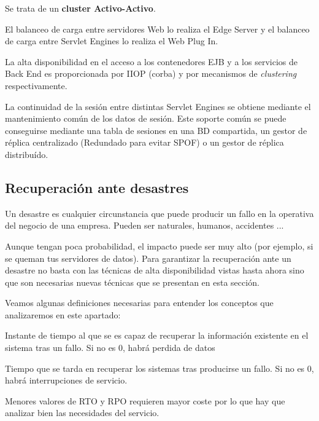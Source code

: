 \begin{enumerate}
\begin{example}
Se trata de un \textbf{cluster Activo-Activo}.

El balanceo de carga entre servidores Web lo realiza el Edge Server y el balanceo de carga entre Servlet Engines lo realiza el Web Plug In.

La alta disponibilidad en el acceso a los contenedores EJB y a los servicios de Back End es proporcionada por IIOP (corba) y por mecanismos de \textit{clustering} respectivamente.

La continuidad de la sesión entre distintas Servlet Engines se obtiene mediante el mantenimiento común de los datos de sesión. Este soporte común se puede conseguirse mediante una tabla de sesiones en una BD compartida, un gestor de réplica centralizado (Redundado para evitar SPOF) o un gestor de réplica distribuído.
\end{example}

\end{enumerate}

\subsection{Recuperación ante desastres}

Un desastre es cualquier circunstancia que puede producir un fallo en la operativa del negocio de una empresa. Pueden ser naturales, humanos, accidentes ...

Aunque tengan poca probabilidad, el impacto puede ser muy alto (por ejemplo, si se queman tus servidores de datos). Para garantizar la recuperación ante un desastre no basta con las técnicas de alta disponibilidad vistas hasta ahora sino que son necesarias nuevas técnicas que se presentan en esta sección.

Veamos algunas definiciones necesarias para entender los conceptos que analizaremos en este apartado:

\begin{defn}
Instante de tiempo al que se es capaz de recuperar la información existente en el sistema tras un fallo. Si no es 0, habrá perdida de datos
\end{defn}

\begin{defn}
Tiempo que se tarda en recuperar los sistemas tras producirse un fallo. Si no es 0, habrá interrupciones de servicio.
\end{defn}

Menores valores de RTO y RPO requieren mayor coste por lo que hay que analizar bien las necesidades del servicio.

